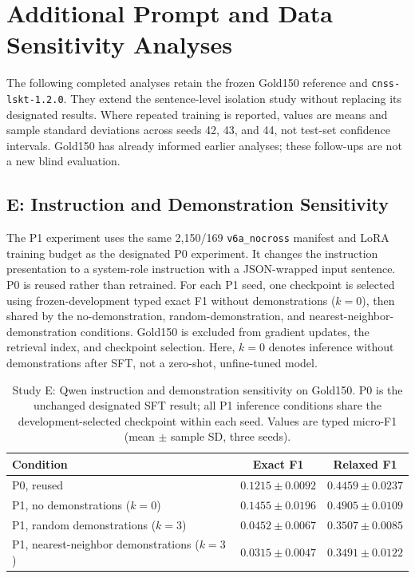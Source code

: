 \section{Additional Prompt and Data Sensitivity Analyses}
\label{sec:efg-followup}

The following completed analyses retain the frozen Gold150 reference and \texttt{cnss-lskt-1.2.0}. They extend the sentence-level isolation study without replacing its designated results. Where repeated training is reported, values are means and sample standard deviations across seeds 42, 43, and 44, not test-set confidence intervals. Gold150 has already informed earlier analyses; these follow-ups are not a new blind evaluation.

\subsection{E: Instruction and Demonstration Sensitivity}
\label{sec:p1-contrast}

The P1 experiment uses the same 2,150/169 \texttt{v6a\_nocross} manifest and LoRA training budget as the designated P0 experiment. It changes the instruction presentation to a system-role instruction with a JSON-wrapped input sentence. P0 is reused rather than retrained. For each P1 seed, one checkpoint is selected using frozen-development typed exact F1 without demonstrations ($k=0$), then shared by the no-demonstration, random-demonstration, and nearest-neighbor-demonstration conditions. Gold150 is excluded from gradient updates, the retrieval index, and checkpoint selection. Here, $k=0$ denotes inference without demonstrations after SFT, not a zero-shot, unfine-tuned model.

\begin{table}[htbp]
\caption{Study E: Qwen instruction and demonstration sensitivity on Gold150. P0 is the unchanged designated SFT result; all P1 inference conditions share the development-selected checkpoint within each seed. Values are typed micro-F1 (mean $\pm$ sample SD, three seeds).}
\label{tab:appendix-e-p1}
\centering
\small
\begin{tabularx}{\linewidth}{@{}Lcc@{}}
\toprule
Condition & Exact F1 & Relaxed F1 \\
\midrule
P0, reused & $0.1215\pm0.0092$ & $0.4459\pm0.0237$ \\
P1, no demonstrations ($k=0$) & $0.1455\pm0.0196$ & $0.4905\pm0.0109$ \\
P1, random demonstrations ($k=3$) & $0.0452\pm0.0067$ & $0.3507\pm0.0085$ \\
P1, nearest-neighbor demonstrations ($k=3$) & $0.0315\pm0.0047$ & $0.3491\pm0.0122$ \\
\bottomrule
\end{tabularx}
\end{table}

